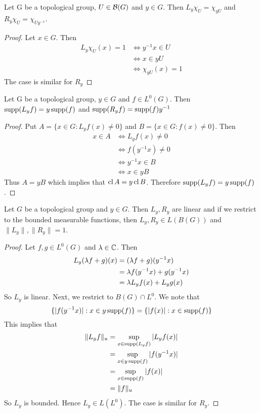 \documentclass{book}
\begin{document}
	\begin{ex}  
		Let G be a topological group, $U \in \mathcal{B}(G)$ and $y \in G$. Then $L_y\chi_U = \chi_{yU}$ and $R_y\chi_U = \chi_{Uy^{-1}}$. 
	\end{ex}
	
	\begin{proof}
		Let $x \in G$. Then 
		\begin{align*}
			L_y\chi_U(x) = 1
			& \iff y^{-1}x \in U\\
			& \iff x \in yU \\
			& \iff \chi_{yU}(x) = 1
		\end{align*}
		The case is similar for $R_y$
	\end{proof}
	
	\begin{ex}  
		Let G be a topological group, $y \in G$ and $f \in L^0(G)$. Then $\operatorname{supp}(L_yf) = y\operatorname{supp}(f)$ and $\operatorname{supp}(R_yf) = \operatorname{supp}(f)y^{-1}$
	\end{ex}
	
	\begin{proof}
		Put $A = \{x \in G: L_yf(x) \neq 0 \}$ and $B = \{x \in G: f(x) \neq 0 \}$. Then 
		\begin{align*}
			x \in A
			& \iff L_yf(x) \neq 0 \\
			& \iff f(y^{-1}x) \neq 0 \\
			& \iff y^{-1}x \in B \\
			& \iff x \in yB
		\end{align*}
		Thus $A = yB$ which implies that $\operatorname{cl} A = y \operatorname{cl} B$. Therefore $\operatorname{supp}(L_yf) = y\operatorname{supp}(f)$.
	\end{proof}
	
	\begin{ex}  
		Let $G$ be a topological group and $y \in G$. Then $L_y, R_y$ are linear and if we restrict to the bounded measurable functions, then  $L_y, R_y \in L(B(G))$ and $\|L_y\|, \|R_y\| = 1$. 
	\end{ex}
	
	\begin{proof}
		Let $f, g \in L^0(G)$ and $\lambda \in \mathbb{C}$. Then 
		\begin{align*}
			L_y(\lambda f+g)(x)
			& = (\lambda f+g)(y^{-1}x) \\
			& = \lambda f(y^{-1}x) + g(y^{-1}x) \\
			& = \lambda L_yf(x) + L_yg(x)
		\end{align*}
		So $L_y$ is linear. Next, we restrict to $B(G) \cap L^0$. We note that $$\{|f(y^{-1}x)|: x \in y\operatorname{supp}(f)\} = \{|f(x)|: x \in \operatorname{supp}(f)\}$$ This implies that 
		\begin{align*}
			\|L_yf \|_u 
			& = \sup_{x \in \operatorname{supp}(L_yf)} |L_yf(x)| \\
			& = \sup_{x \in y\operatorname{supp}(f)} |f(y^{-1}x)| \\
			& = \sup_{x \in \operatorname{supp}(f)} |f(x)| \\ 
			& = \|f\|_u
		\end{align*} 
		So $L_y$ is bounded. Hence $L_y \in L(L^0)$. The case is similar for $R_y$.
	\end{proof}
	
\end{document}
